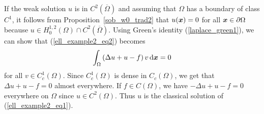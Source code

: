 \begin{egg}
If the weak solution $u$ is in $\displaystyle C^2(\overline{\Omega})$
and assuming that $\Omega$ has a boundary of class
$\displaystyle C^1$, it follows from
Proposition~\ref{sob_w0_trad2} that $u({\bm{x}})=0$ for
all ${\bm{x}}\in \partial \Omega$ because
$\displaystyle u \in H^{1,2}_0(\Omega)\cap C^2(\overline{\Omega})$.
Using Green's identity (\ref{laplace_green1}), we can show
that (\ref{ell_example2_eq2}) becomes
\[
\int_\Omega \left( \Delta u + u - f\right)
v \,\mathrm{d}{{\bm{x}}} = 0
\]
for all $\displaystyle v \in C^1_c(\Omega)$.
Since $\displaystyle C^1_c(\Omega)$ is dense in $C_c(\Omega)$, we
get that $\displaystyle \Delta u + u - f = 0$ almost
everywhere.  If $f \in C(\Omega)$, we have
$\displaystyle -\Delta u + u -f = 0$ everywhere on $\Omega$ since
$\displaystyle u\in C^2(\Omega)$.  Thus $u$ is the classical solution of
(\ref{ell_example2_eq1}).
\end{egg}


